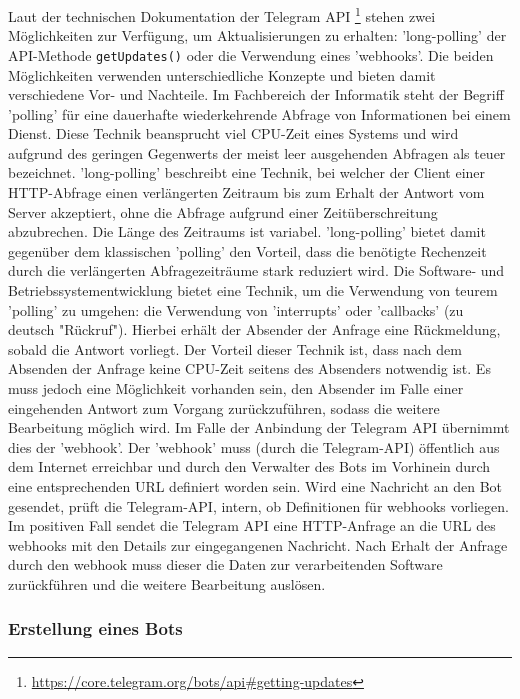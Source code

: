 Laut der technischen Dokumentation der Telegram API \footnote{\url{https://core.telegram.org/bots/api\#getting-updates}} stehen zwei Möglichkeiten zur Verfügung, um Aktualisierungen zu erhalten: 'long-polling' der API-Methode \lstinline{getUpdates()} oder die Verwendung eines 'webhooks'. Die beiden Möglichkeiten verwenden unterschiedliche Konzepte und bieten damit verschiedene Vor- und Nachteile. Im Fachbereich der Informatik steht der Begriff 'polling' für eine dauerhafte wiederkehrende Abfrage von Informationen bei einem Dienst. Diese Technik beansprucht viel CPU-Zeit eines Systems und wird aufgrund des geringen Gegenwerts der meist leer ausgehenden Abfragen als teuer bezeichnet. 'long-polling' beschreibt eine Technik, bei welcher der Client einer HTTP-Abfrage einen verlängerten Zeitraum bis zum Erhalt der Antwort vom Server akzeptiert, ohne die Abfrage aufgrund einer Zeitüberschreitung abzubrechen. Die Länge des Zeitraums ist variabel. 'long-polling' bietet damit gegenüber dem klassischen 'polling' den Vorteil, dass die benötigte Rechenzeit durch die verlängerten Abfragezeiträume stark reduziert wird. Die Software- und Betriebssystementwicklung bietet eine Technik, um die Verwendung von teurem 'polling' zu umgehen: die Verwendung von 'interrupts' oder 'callbacks' (zu deutsch "Rückruf"). Hierbei erhält der Absender der Anfrage eine Rückmeldung, sobald die Antwort vorliegt. Der Vorteil dieser Technik ist, dass nach dem Absenden der Anfrage keine CPU-Zeit seitens des Absenders notwendig ist. Es muss jedoch eine Möglichkeit vorhanden sein, den Absender im Falle einer eingehenden Antwort zum Vorgang zurückzuführen, sodass die weitere Bearbeitung möglich wird. Im Falle der Anbindung der Telegram API übernimmt dies der 'webhook'. Der 'webhook' muss (durch die Telegram-API) öffentlich aus dem Internet erreichbar und durch den Verwalter des Bots im Vorhinein durch eine entsprechenden URL definiert worden sein. Wird eine Nachricht an den Bot gesendet, prüft die Telegram-API, intern, ob Definitionen für webhooks vorliegen. Im positiven Fall sendet die Telegram API eine HTTP-Anfrage an die URL des webhooks mit den Details zur eingegangenen Nachricht. Nach Erhalt der Anfrage durch den webhook muss dieser die Daten zur verarbeitenden Software zurückführen und die weitere Bearbeitung auslösen.

\subsubsection{Erstellung eines Bots}

